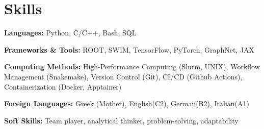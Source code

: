 \documentclass[letterpaper,11pt]{article}
\begin{document}



\section{Skills}
  \vspace{2pt}
  \resumeSubHeadingListStart
    \small{\item{
        
        \textbf{Languages:}{ Python, C/C++, Bash, SQL} \\ \vspace{3pt}

        \textbf{Frameworks \& Tools:}{ ROOT, SWIM, TensorFlow, PyTorch, GraphNet, JAX} 
        
        \textbf{Computing Methods:}{ High-Performance Computing (Slurm, UNIX), Workflow Management (Snakemake), Version Control (Git), CI/CD (Github Actions), Containerization (Docker, Apptainer)} \\ \vspace{3pt}
        


        \textbf{Foreign Languages:} {Greek (Mother), English(C2), German(B2), Italian(A1)} \\ \vspace{3pt}

        \textbf{Soft Skills:}{ Team player, analytical thinker, problem-solving, adaptability} \\ \vspace{3pt}
    }}
  \resumeSubHeadingListEnd
\end{document}
